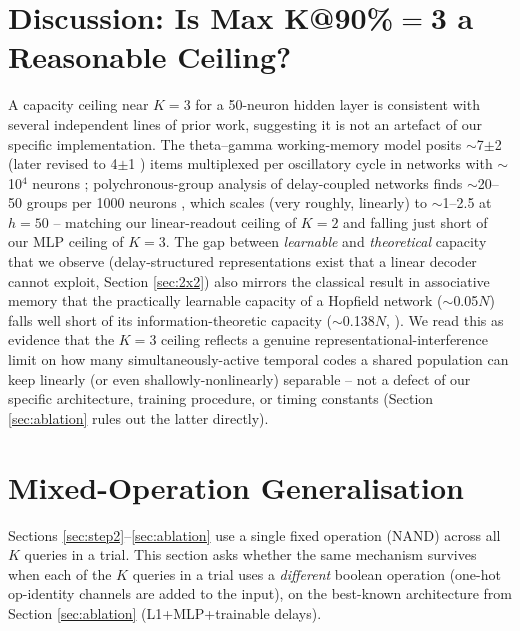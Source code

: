\documentclass[conference]{IEEEtran}
\begin{document}
\section{Discussion: Is Max K@90\%$=$3 a Reasonable Ceiling?}
\label{sec:discussion}

A capacity ceiling near $K{=}3$ for a 50-neuron hidden layer is consistent with several
independent lines of prior work, suggesting it is not an artefact of our specific
implementation. The theta--gamma working-memory model posits $\sim$7$\pm$2 (later revised
to 4$\pm$1 \cite{cowan2001magical}) items multiplexed per oscillatory cycle in networks
with $\sim$10$^4$ neurons \cite{lisman1995storage}; polychronous-group analysis of
delay-coupled networks finds $\sim$20--50 groups per 1000 neurons
\cite{izhikevich2006polychronization}, which scales (very roughly, linearly) to
$\sim$1--2.5 at $h{=}50$ -- matching our linear-readout ceiling of $K{=}2$ and falling
just short of our MLP ceiling of $K{=}3$. The gap between \emph{learnable} and
\emph{theoretical} capacity that we observe (delay-structured representations exist that
a linear decoder cannot exploit, Section \ref{sec:2x2}) also mirrors the classical
result in associative memory that the practically learnable capacity of a Hopfield
network ($\sim$0.05$N$) falls well short of its information-theoretic capacity
($\sim$0.138$N$, \cite{hopfield1982neural,amit1985storing}). We read this as evidence that
the $K{=}3$ ceiling reflects a genuine representational-interference limit on how many
simultaneously-active temporal codes a shared population can keep linearly (or even
shallowly-nonlinearly) separable -- not a defect of our specific architecture, training
procedure, or timing constants (Section \ref{sec:ablation} rules out the latter
directly).

\section{Mixed-Operation Generalisation}
\label{sec:step3}

Sections \ref{sec:step2}--\ref{sec:ablation} use a single fixed operation (NAND) across
all $K$ queries in a trial. This section asks whether the same mechanism survives when each of
the $K$ queries in a trial uses a \emph{different} boolean operation (one-hot
op-identity channels are added to the input), on the best-known architecture from Section
\ref{sec:ablation} (L1+MLP+trainable delays).
\end{document}
